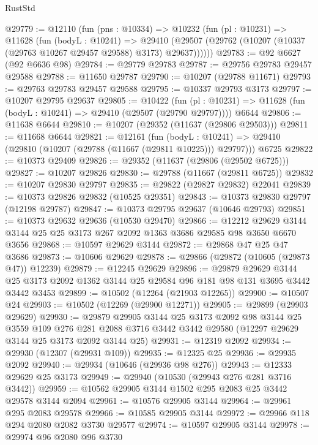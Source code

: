 \begin{lexlean}{RustStd}
\begin{coremodule}
@29779 := @12110
    (fun (pns : @10334) =>
    @10232
      (fun (pl : @10231) =>
      @11628
        (fun (bodyL : @10241) =>
        @29410 (@29507 (@29762 (@10207 (@10337 (@29763 @10267 @29457 @29588) @3173) @29637))))))
@29783 := @92 @6627 (@92 @6636 @98)
@29784 := @29779 @29783
@29787 := @29756 @29783 @29457 @29588
@29788 := @11650 @29787
@29790 := @10207 (@29788 @11671)
@29793 := @29763 @29783 @29457 @29588
@29795 := @10337 @29793 @3173
@29797 := @10207 @29795 @29637
@29805 := @10422
    (fun (pl : @10231) => @11628 (fun (bodyL : @10241) => @29410 (@29507 (@29790 @29797))))
    @6644
@29806 := @11638 @6644
@29810 := @10207 (@29352 (@11637 (@29806 @29503)))
@29811 := @11668 @6644
@29821 := @12161
    (fun (bodyL : @10241) => @29410 (@29810 (@10207 (@29788 (@11667 (@29811 @10225))) @29797)))
    @6725
@29822 := @10373 @29409
@29826 := @29352 (@11637 (@29806 (@29502 @6725)))
@29827 := @10207 @29826
@29830 := @29788 (@11667 (@29811 @6725))
@29832 := @10207 @29830 @29797
@29835 := @29822 (@29827 @29832) @22041
@29839 := @10373 @29826 @29832 (@10525 @29351)
@29843 := @10373 @29830 @29797 (@12198 @29787)
@29847 := @10373 @29795 @29637 (@10646 @29793)
@29851 := @10373 @29632 @29636 (@10530 @29470)
@29866 := @12212
    @29629
    @3144
    @3144
    @25
    @25
    @3173
    @267
    @2092
    @1363
    @3686
    @29585
    @98
    @3650
    @6670
    @3656
@29868 := @10597 @29629 @3144
@29872 := @29868 @47 @25 @47 @3686
@29873 := @10606 @29629
@29878 := @29866 (@29872 (@10605 (@29873 @47)) @12239)
@29879 := @12245 @29629
@29896 := @29879
    @29629
    @3144
    @25
    @3173
    @2092
    @1362
    @3144
    @25
    @29584
    @96
    @181
    @98
    @131
    @3695
    @3442
    @3442
    @3453
@29899 := @10502 (@12264 (@21903 @12265))
@29900 := @10507 @24
@29903 := @10502 (@12269 (@29900 @12271))
@29905 := @29899 (@29903 @29629)
@29930 := @29879
    @29905
    @3144
    @25
    @3173
    @2092
    @98
    @3144
    @25
    @3559
    @109
    @276
    @281
    @2088
    @3716
    @3442
    @3442
    @29580
    (@12297 @29629 @3144 @25 @3173 @2092 @3144 @25)
@29931 := @12319 @2092
@29934 := @29930 (@12307 (@29931 @109))
@29935 := @12325 @25
@29936 := @29935 @2092
@29940 := @29934 (@10646 (@29936 @98 @276))
@29943 := @12333 @29629 @25 @3173
@29949 := @29940 (@10530 (@29943 @276 @281 @3716 @3442))
@29959 := @10562 @29905 @3144 @1502 @295 @2083 @25 @3442 @29578 @3144 @2094
@29961 := @10576 @29905 @3144
@29964 := @29961 @295 @2083 @29578
@29966 := @10585 @29905 @3144
@29972 := @29966 @118 @294 @2080 @2082 @3730 @29577
@29974 := @10597 @29905 @3144
@29978 := @29974 @96 @2080 @96 @3730

\end{coremodule}
\end{lexlean}
